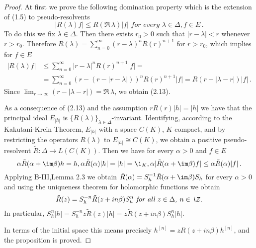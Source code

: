 \begin{proof}
At first we prove the following domination property which is the extension of (1.5) to pseudo-resolvents
\begin{equation}\label{eq:c3-2.13}
	|R(\lambda)f| \leq R(\Re\, \lambda) |f| \textit{ for every } \lambda \in \Delta , f \in E\,.
\end{equation}
To do this we fix $\lambda \in \Delta$.
Then there exists $r_{0} > 0$ such that $|r-\lambda| < r$ whenever $r > r_{0}$.
Therefore $R(\lambda) = \sum_{n=0}^{\infty}(r-\lambda)^{n}R(r)^{n+1}$ for $r > r_{0}$, which implies for $f \in E$
\begin{align*}
	|R(\lambda)f| &\leq \sum_{n=0}^{\infty}|r-\lambda|^{n}R(r)^{n+1}|f| = \\
	& =\sum_{n=0}^{\infty}(r - (r-|r-\lambda|))^{n}R(r)^{n+1}|f| = R(r - |\lambda-r|) |f|\,.
\end{align*}
Since $\lim_{r \to \infty} (r - |\lambda-r|) = \Re\, \lambda$, we obtain (2.13).

As a consequence of (2.13) and the assumption $rR(r) |h| = |h|$ we have that the principal ideal $E_{|h|}$ is $\{R(\lambda)\}_{\lambda \in \Delta}$-invariant.
Identifying, according to the Kakutani-Krein Theorem, $E_{|h|}$ with a space $C(K)$, $K$ compact, and by restricting the operators $R(\lambda)$ to $E_{|h|} \cong C(K)$, we obtain a positive pseudo-resolvent $\tilde{R} : \Delta \to L(C(K))$.
Then we have for every $\alpha > 0$ and $f \in E$
\[
\alpha\tilde{R}(\alpha+\im\beta)h = h, \alpha\tilde{R}(\alpha) |h| = |h| = \1_{K}, \alpha|\tilde{R}(\alpha+\im\beta)f| \leq \alpha\tilde{R}(\alpha) |f|\,.
\]
Applying B-III,Lemma 2.3 we obtain $\tilde{R}(\alpha) = S_{h}^{-1}\tilde{R}(\alpha + \im\beta)S_{h}$ for every $\alpha > 0$ and using the uniqueness theorem for holomorphic functions we obtain
\begin{equation}\label{eq:c3-2.14}
\textit{$\tilde{R}(z) = S_{h}^{-n}\tilde{R}(z + in\beta)S_{h}^{n}$ for all $z \in \Delta$, $n \in \Z$}\,.
\end{equation}
In particular, $S_{h}^{n}|h| = S_{h}^{-n}z\tilde{R}(z) |h| = z\tilde{R}(z+in\beta)S_{h}^{n}|h|$.

In terms of the initial space this means precisely $h^{[n]} = zR(z+in\beta)h^{[n]}$, and the proposition is proved.
\end{proof}

